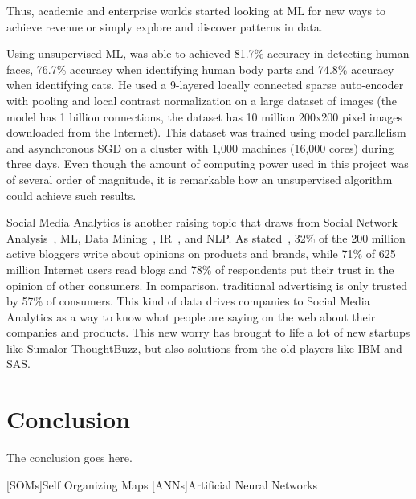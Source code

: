 \documentclass[journal]{IEEEtran}
\begin{document}
Thus, academic and enterprise worlds started looking at \ac{ML} for new ways to achieve revenue or simply explore and discover patterns in data. 

Using unsupervised \ac{ML}, \citet{Le2011} was able to achieved 81.7\% accuracy in detecting human faces, 76.7\% accuracy when identifying human body parts and 74.8\% accuracy when identifying cats. He used a 9-layered locally connected sparse auto-encoder with pooling and local contrast normalization on a large dataset of images (the model has 1 billion connections, the dataset has 10 million 200x200 pixel images downloaded from the Internet). This dataset was trained using model parallelism and asynchronous SGD on a cluster with 1,000 machines (16,000 cores) during three days. Even though the amount of computing power used in this project was of several order of magnitude, it is remarkable how an unsupervised algorithm could achieve such results.

Social Media Analytics is another raising topic that draws from Social Network Analysis~\cite{knoke2008social}, \ac{ML}, Data Mining~\cite{witten2005data}, \ac{IR}~\cite{salton1983introduction}, and \ac{NLP}. As stated~\citet{Melville2009}, 32\% of the 200 million active bloggers write about opinions on products and brands, while 71\% of 625 million Internet users read blogs and 78\% of respondents put their trust in the opinion of other consumers. In comparison, traditional advertising is only trusted by 57\% of consumers.
This kind of data drives companies to Social Media Analytics as a way to know what people are saying on the web about their companies and products. This new worry has brought to life a lot of new startups like Sumalor ThoughtBuzz, but also solutions from the old players like IBM and SAS.


\section{Conclusion}
The conclusion goes here.


\appendices






\begin{acronym}[TDMA]
	[SOMs]{Self Organizing Maps}
	[ANNs]{Artificial Neural Networks}
\end{acronym}
\end{document}
